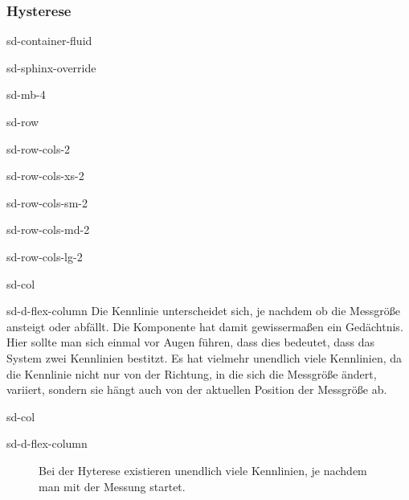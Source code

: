 \documentclass[letterpaper,10pt,english]{jupyterBook}
\let\sphinxpxdimen\pdfpxdimen\else\newdimen\sphinxpxdimen
\begin{document}
\subsubsection{Hysterese}
\label{\detokenize{content/2_realeKennlinie:hysterese}}
\begin{sphinxuseclass}{sd-container-fluid}
\begin{sphinxuseclass}{sd-sphinx-override}
\begin{sphinxuseclass}{sd-mb-4}
\begin{sphinxuseclass}{sd-row}
\begin{sphinxuseclass}{sd-row-cols-2}
\begin{sphinxuseclass}{sd-row-cols-xs-2}
\begin{sphinxuseclass}{sd-row-cols-sm-2}
\begin{sphinxuseclass}{sd-row-cols-md-2}
\begin{sphinxuseclass}{sd-row-cols-lg-2}
\begin{sphinxuseclass}{sd-col}
\begin{sphinxuseclass}{sd-d-flex-column}
\sphinxAtStartPar
Die Kennlinie unterscheidet sich, je nachdem ob die Messgröße ansteigt oder abfällt. Die Komponente hat damit gewissermaßen ein Gedächtnis. Hier sollte man sich einmal vor Augen führen, dass dies  bedeutet, dass das System zwei Kennlinien bestitzt. Es hat vielmehr unendlich viele Kennlinien, da die Kennlinie nicht nur von der Richtung, in die sich die Messgröße ändert, variiert, sondern sie hängt auch von der aktuellen Position der Messgröße ab.

\end{sphinxuseclass}
\end{sphinxuseclass}
\begin{sphinxuseclass}{sd-col}
\begin{sphinxuseclass}{sd-d-flex-column}
\begin{figure}[htbp]
\centering
\capstart

\noindent\sphinxincludegraphics[width=200\sphinxpxdimen]{{hysterese}.jpg}
\caption{Bei der Hyterese existieren unendlich viele Kennlinien, je nachdem  man mit der Messung startet.}\label{\detokenize{content/2_realeKennlinie:id2}}\end{figure}

\end{sphinxuseclass}
\end{sphinxuseclass}
\end{sphinxuseclass}
\end{sphinxuseclass}
\end{sphinxuseclass}
\end{sphinxuseclass}
\end{sphinxuseclass}
\end{sphinxuseclass}
\end{sphinxuseclass}
\end{sphinxuseclass}
\end{sphinxuseclass}
\end{document}
